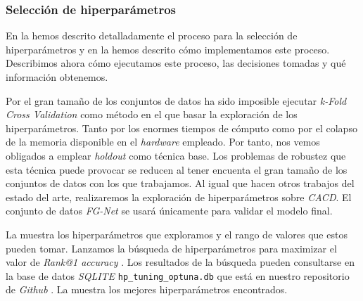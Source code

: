 \subsubsection{Selección de hiperparámetros} \label{isec:experimentacion_hp_tuning}

En la  hemos descrito detalladamente el proceso para la selección de hiperparámetros y en la  hemos descrito cómo implementamos este proceso. Describimos ahora cómo ejecutamos este proceso, las decisiones tomadas y qué información obtenemos.

Por el gran tamaño de los conjuntos de datos ha sido imposible ejecutar \textit{k-Fold Cross Validation} como método en el que basar la exploración de los hiperparámetros. Tanto por los enormes tiempos de cómputo como por el colapso de la memoria disponible en el \textit{hardware} empleado. Por tanto, nos vemos obligados a emplear \textit{holdout} como técnica base. Los problemas de robustez que esta técnica puede provocar se reducen al tener encuenta el gran tamaño de los conjuntos de datos con los que trabajamos. Al igual que hacen otros trabajos del estado del arte, realizaremos la exploración de hiperparámetros sobre \textit{CACD}. El conjunto de datos \textit{FG-Net} se usará únicamente para validar el modelo final.

La  muestra los hiperparámetros que exploramos y el rango de valores que estos pueden tomar. Lanzamos la búsqueda de hiperparámetros para maximizar el valor de \textit{Rank@1 accuracy} \footnotemark. Los resultados de la búsqueda pueden consultarse en la base de datos \textit{SQLITE} \lstinline{hp_tuning_optuna.db} que está en nuestro repositorio de \textit{Github} \footnotemark. La  muestra los mejores hiperparámetros encontrados.


